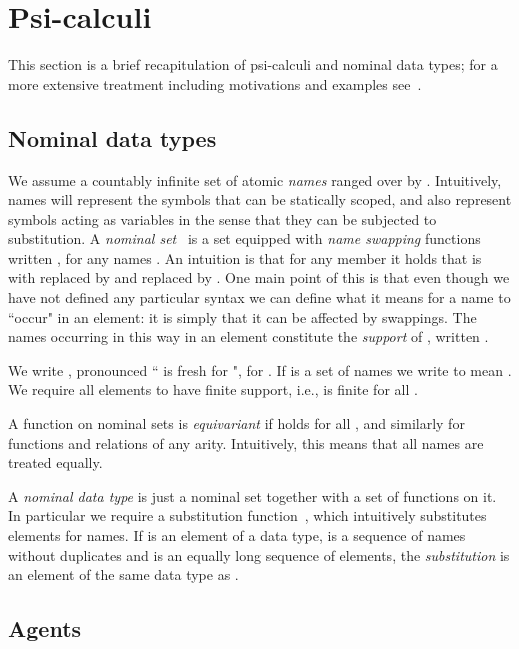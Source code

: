 \documentclass{eptcs}
\theoremstyle{definition}
\begin{document}
\section{Psi-calculi}\label{sec:psi}

This section is a brief recapitulation of psi-calculi and nominal data types; for a more extensive treatment including motivations and examples see~\cite{bengtson.johansson.ea:psi-calculi}.

\subsection{Nominal data types}

We assume a countably infinite set of atomic {\em names}  ranged over by . Intuitively, names will represent the symbols that can be statically scoped, and also represent symbols acting as variables in the sense that they can be subjected to substitution. 
A {\em nominal set}~\cite{PittsAM:nomlfo-jv,Gabbay01anew} is a set equipped with {\em name swapping} functions written , for any names . An intuition is that for any member  it holds that  is  with   replaced by  and   replaced by . One main point of this is that  even though we have not defined any particular syntax we can define what it means for a name to ``occur" in an element: it is simply that it can be affected by swappings. 
The names occurring in this way  in an element  constitute the  {\em support} of , written .

  We write , pronounced `` is fresh for ", for .  If  is a set of names we write  to mean .
We require all elements to have finite support, i.e.,  is finite for all
.


A function  on nominal sets is {\em equivariant} if  holds for all , and similarly for functions and
relations of any
arity. Intuitively, this means that all
names are treated equally.

A {\em nominal data type} is just a nominal set together with a set of functions on it. In particular we require a substitution function~\cite{bengtson.parrow:psi-calculi-isabelle}, which intuitively substitutes elements  for  names. If  is an element of a data type,  is a sequence of names without duplicates and  is an equally long sequence of elements, the {\em substitution}
 is an element of the same data type as . 


\subsection{Agents}
\end{document}
